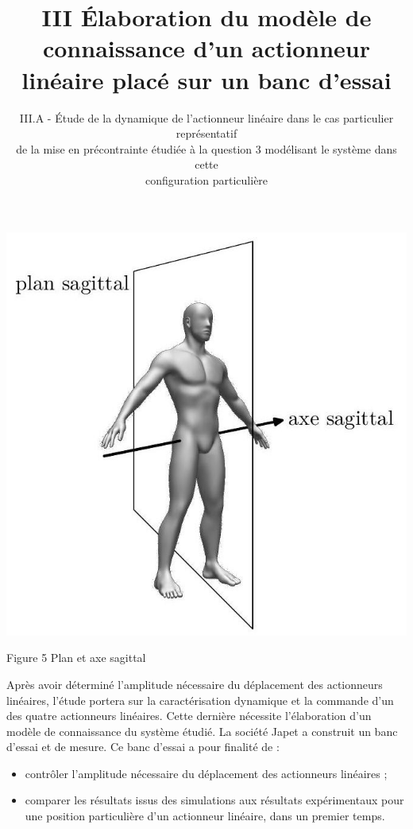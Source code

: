 \documentclass[10pt]{article}
\title{III Élaboration du modèle de connaissance d'un actionneur linéaire placé sur un banc d'essai }
\author{III.A - Étude de la dynamique de l'actionneur linéaire dans le cas particulier représentatif\\
de la mise en précontrainte étudiée à la question 3 modélisant le système dans cette\\
configuration particulière}
\date{}
\begin{document}
\maketitle
\begin{center}
\includegraphics[max width=\textwidth]{2024_03_20_0c3cf888f6e04b1986bcg-04}
\end{center}

Figure 5 Plan et axe sagittal

Après avoir déterminé l'amplitude nécessaire du déplacement des actionneurs linéaires, l'étude portera sur la caractérisation dynamique et la commande d'un des quatre actionneurs linéaires. Cette dernière nécessite l'élaboration d'un modèle de connaissance du système étudié. La société Japet a construit un banc d'essai et de mesure. Ce banc d'essai a pour finalité de :

\begin{itemize}
  \item contrôler l'amplitude nécessaire du déplacement des actionneurs linéaires ;

  \item comparer les résultats issus des simulations aux résultats expérimentaux pour une position particulière d'un actionneur linéaire, dans un premier temps.

\end{itemize}
\end{document}
